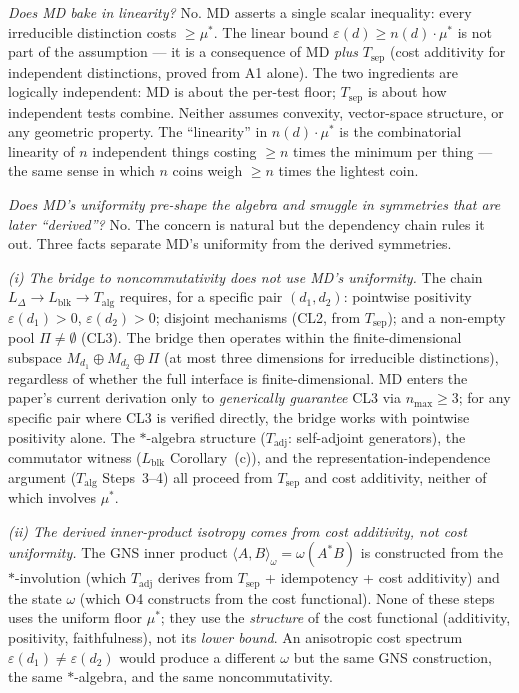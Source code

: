 \documentclass[11pt]{article}
\theoremstyle{remark}
\begin{document}
\smallskip\noindent\textit{Does MD bake in linearity?}  No.  MD asserts a single scalar inequality: every irreducible distinction costs $\ge \mu^*$.  The linear bound $\varepsilon(d) \ge n(d) \cdot \mu^*$ is not part of the assumption --- it is a consequence of MD \emph{plus} $T_{\mathrm{sep}}$ (cost additivity for independent distinctions, proved from A1 alone).  The two ingredients are logically independent: MD is about the per-test floor; $T_{\mathrm{sep}}$ is about how independent tests combine.  Neither assumes convexity, vector-space structure, or any geometric property.  The ``linearity'' in $n(d) \cdot \mu^*$ is the combinatorial linearity of $n$ independent things costing $\ge n$ times the minimum per thing --- the same sense in which $n$ coins weigh $\ge n$ times the lightest coin.

\smallskip\noindent\textit{Does MD's uniformity pre-shape the algebra and smuggle in symmetries that are later ``derived''?}  No.  The concern is natural but the dependency chain rules it out.  Three facts separate MD's uniformity from the derived symmetries.

\emph{(i) The bridge to noncommutativity does not use MD's uniformity.}  The chain $L_\Delta \to L_{\mathrm{blk}} \to T_{\mathrm{alg}}$ requires, for a specific pair $(d_1, d_2)$: pointwise positivity $\varepsilon(d_1) > 0$, $\varepsilon(d_2) > 0$; disjoint mechanisms (CL2, from $T_{\mathrm{sep}}$); and a non-empty pool $\Pi \ne \emptyset$ (CL3).  The bridge then operates within the finite-dimensional subspace $M_{d_1} \oplus M_{d_2} \oplus \Pi$ (at most three dimensions for irreducible distinctions), regardless of whether the full interface is finite-dimensional.  MD enters the paper's current derivation only to \emph{generically guarantee} CL3 via $n_{\max} \ge 3$; for any specific pair where CL3 is verified directly, the bridge works with pointwise positivity alone.  The $*$-algebra structure ($T_{\mathrm{adj}}$: self-adjoint generators), the commutator witness ($L_{\mathrm{blk}}$ Corollary~(c)), and the representation-independence argument ($T_{\mathrm{alg}}$ Steps~3--4) all proceed from $T_{\mathrm{sep}}$ and cost additivity, neither of which involves $\mu^*$.

\emph{(ii) The derived inner-product isotropy comes from cost additivity, not cost uniformity.}  The GNS inner product $\langle A, B \rangle_\omega = \omega(A^*B)$ is constructed from the $*$-involution (which $T_{\mathrm{adj}}$ derives from $T_{\mathrm{sep}}$ + idempotency + cost additivity) and the state $\omega$ (which O4 constructs from the cost functional).  None of these steps uses the uniform floor $\mu^*$; they use the \emph{structure} of the cost functional (additivity, positivity, faithfulness), not its \emph{lower bound}.  An anisotropic cost spectrum $\varepsilon(d_1) \ne \varepsilon(d_2)$ would produce a different $\omega$ but the same GNS construction, the same $*$-algebra, and the same noncommutativity.
\end{document}

